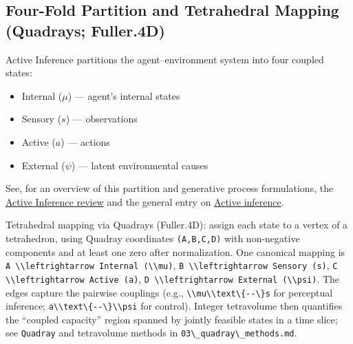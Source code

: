 \documentclass[
  10pt,
]{article}
\newcommand{\passthrough}[1]{#1}
\providecommand{\tightlist}{%
  \setlength{\itemsep}{0pt}\setlength{\parskip}{0pt}}
\begin{document}
\hypertarget{four-fold-partition-and-tetrahedral-mapping-quadrays-fuller.4d}{%
\subsection{Four-Fold Partition and Tetrahedral Mapping (Quadrays;
Fuller.4D)}\label{four-fold-partition-and-tetrahedral-mapping-quadrays-fuller.4d}}

Active Inference partitions the agent--environment system into four
coupled states:

\begin{itemize}
\tightlist
\item
  Internal (\(\mu\)) --- agent's internal states
\item
  Sensory (\(s\)) --- observations
\item
  Active (\(a\)) --- actions
\item
  External (\(\psi\)) --- latent environmental causes
\end{itemize}

See, for an overview of this partition and generative process
formulations, the
\href{https://discovery.ucl.ac.uk/id/eprint/10176959/1/1-s2.0-S1571064523001094-main.pdf}{Active
Inference review} and the general entry on
\href{https://en.wikipedia.org/wiki/Active_inference}{Active inference}.

Tetrahedral mapping via Quadrays (Fuller.4D): assign each state to a
vertex of a tetrahedron, using Quadray coordinates
\passthrough{\lstinline!(A,B,C,D)!} with non-negative components and at
least one zero after normalization. One canonical mapping is
\passthrough{\lstinline!A \\leftrightarrow Internal (\\mu)!},
\passthrough{\lstinline!B \\leftrightarrow Sensory (s)!},
\passthrough{\lstinline!C \\leftrightarrow Active (a)!},
\passthrough{\lstinline!D \\leftrightarrow External (\\psi)!}. The edges
capture the pairwise couplings (e.g.,
\passthrough{\lstinline!\\mu\\text\{--\}s!} for perceptual inference;
\passthrough{\lstinline!a\\text\{--\}\\psi!} for control). Integer
tetravolume then quantifies the ``coupled capacity'' region spanned by
jointly feasible states in a time slice; see
\passthrough{\lstinline!Quadray!} and tetravolume methods in
\passthrough{\lstinline!03\_quadray\_methods.md!}.
\end{document}
